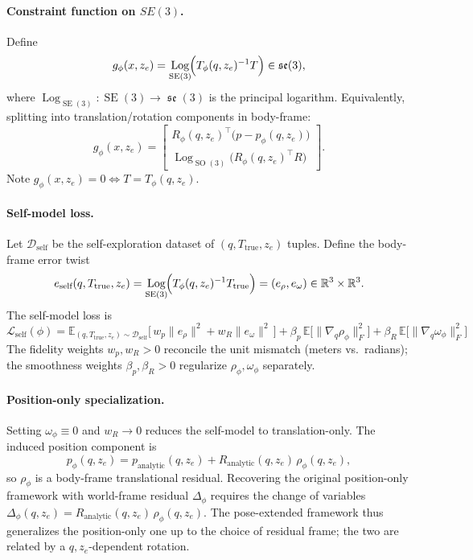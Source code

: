 \documentclass[11pt,a4paper]{article}
\DeclareMathOperator{\Log}{Log}
\DeclareMathOperator{\SE}{SE}
\DeclareMathOperator{\SO}{SO}
\DeclareMathOperator{\se}{\mathfrak{se}}
\newcommand{\R}{\mathbb{R}}
\newcommand{\E}{\mathbb{E}}
\newcommand{\D}{\mathcal{D}}
\newcommand{\Loss}{\mathcal{L}}
\newcommand{\Tphi}{T_\phi}
\begin{document}
\paragraph{Constraint function on $SE(3)$.} Define
\begin{equation}
g_\phi(x, z_e) = \Log_{\SE(3)}\!\Bigl( \Tphi(q, z_e)^{-1} T \Bigr) \in \se(3),
\end{equation}
where $\Log_{\SE(3)}: \SE(3) \to \se(3)$ is the principal logarithm. Equivalently, splitting into translation/rotation components in body-frame:
\begin{equation}
g_\phi(x, z_e) = \begin{bmatrix} R_\phi(q, z_e)^\top \bigl(p - p_\phi(q, z_e)\bigr) \\ \Log_{\SO(3)}\!\bigl( R_\phi(q, z_e)^\top R \bigr) \end{bmatrix}.
\end{equation}
Note $g_\phi(x, z_e) = 0 \iff T = \Tphi(q, z_e)$.

\paragraph{Self-model loss.} Let $\D_{\text{self}}$ be the self-exploration dataset of $(q, T_{\text{true}}, z_e)$ tuples. Define the body-frame error twist
\begin{equation}
e_{\text{self}}(q, T_{\text{true}}, z_e) = \Log_{\SE(3)}\!\Bigl( \Tphi(q, z_e)^{-1} T_{\text{true}} \Bigr) = (e_\rho, e_\omega) \in \R^3 \times \R^3.
\end{equation}
The self-model loss is
\begin{equation}
\Loss_{\text{self}}(\phi) = \E_{(q, T_{\text{true}}, z_e) \sim \D_{\text{self}}} \bigl[\, w_p \| e_\rho \|^2 + w_R \| e_\omega \|^2 \,\bigr] + \beta_p \, \E\bigl[\| \nabla_q \rho_\phi \|_F^2\bigr] + \beta_R \, \E\bigl[\| \nabla_q \omega_\phi \|_F^2\bigr]
\end{equation}
The fidelity weights $w_p, w_R > 0$ reconcile the unit mismatch (meters vs.\ radians); the smoothness weights $\beta_p, \beta_R > 0$ regularize $\rho_\phi, \omega_\phi$ separately.

\paragraph{Position-only specialization.} Setting $\omega_\phi \equiv 0$ and $w_R \to 0$ reduces the self-model to translation-only. The induced position component is
\begin{equation}
p_\phi(q, z_e) = p_{\text{analytic}}(q, z_e) + R_{\text{analytic}}(q, z_e) \, \rho_\phi(q, z_e),
\end{equation}
so $\rho_\phi$ is a body-frame translational residual. Recovering the original position-only framework with world-frame residual $\Delta_\phi$ requires the change of variables $\Delta_\phi(q, z_e) = R_{\text{analytic}}(q, z_e) \, \rho_\phi(q, z_e)$. The pose-extended framework thus generalizes the position-only one up to the choice of residual frame; the two are related by a $q, z_e$-dependent rotation.
\end{document}
